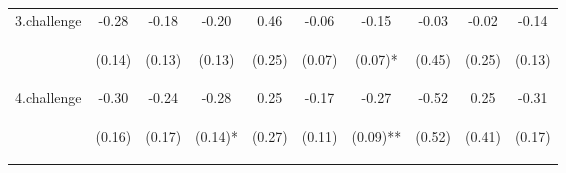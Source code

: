 \begin{center}
\begin{tabular}{lccccccccc}
\noalign{\smallskip}3.challenge & -0.28 & -0.18 & -0.20 & 0.46 & -0.06 & -0.15 & -0.03 & -0.02 & -0.14\\
 & \begin{footnotesize}(0.14)\end{footnotesize} & \begin{footnotesize}(0.13)\end{footnotesize} & \begin{footnotesize}(0.13)\end{footnotesize} & \begin{footnotesize}(0.25)\end{footnotesize} & \begin{footnotesize}(0.07)\end{footnotesize} & \begin{footnotesize}(0.07)*\end{footnotesize} & \begin{footnotesize}(0.45)\end{footnotesize} & \begin{footnotesize}(0.25)\end{footnotesize} & \begin{footnotesize}(0.13)\end{footnotesize}\\
\noalign{\smallskip}4.challenge & -0.30 & -0.24 & -0.28 & 0.25 & -0.17 & -0.27 & -0.52 & 0.25 & -0.31\\
 & \begin{footnotesize}(0.16)\end{footnotesize} & \begin{footnotesize}(0.17)\end{footnotesize} & \begin{footnotesize}(0.14)*\end{footnotesize} & \begin{footnotesize}(0.27)\end{footnotesize} & \begin{footnotesize}(0.11)\end{footnotesize} & \begin{footnotesize}(0.09)**\end{footnotesize} & \begin{footnotesize}(0.52)\end{footnotesize} & \begin{footnotesize}(0.41)\end{footnotesize} & \begin{footnotesize}(0.17)\end{footnotesize}\\

\end{tabular}
\end{center}
